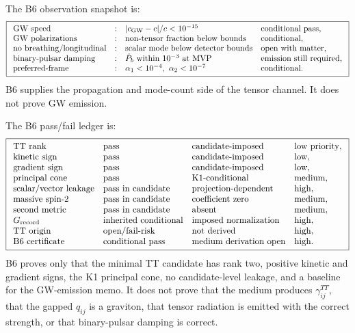 \documentclass[11pt]{article}
\begin{document}
The B6 observation snapshot is:
\[
\boxed{
\begin{array}{llll}
\text{GW speed} &:& |c_{\rm GW}-c|/c<10^{-15} & \text{conditional pass},\\
\text{GW polarizations} &:& \text{non-tensor fraction below bounds} & \text{conditional},\\
\text{no breathing/longitudinal} &:& \text{scalar mode below detector bounds} & \text{open with matter},\\
\text{binary-pulsar damping} &:& \dot P_b\ \text{within }10^{-3}\ \text{at MVP} & \text{emission still required},\\
\text{preferred-frame} &:& \alpha_1<10^{-4},\ \alpha_2<10^{-7} & \text{conditional}.
\end{array}}
\]
B6 supplies the propagation and mode-count side of the tensor channel.  It
does not prove GW emission.

The B6 pass/fail ledger is:
\[
\boxed{
\begin{array}{llll}
\text{TT rank} & \text{pass} & \text{candidate-imposed} & \text{low priority},\\
\text{kinetic sign} & \text{pass} & \text{candidate-imposed} & \text{low},\\
\text{gradient sign} & \text{pass} & \text{candidate-imposed} & \text{low},\\
\text{principal cone} & \text{pass} & \text{K1-conditional} & \text{medium},\\
\text{scalar/vector leakage} & \text{pass in candidate} & \text{projection-dependent} & \text{high},\\
\text{massive spin-2} & \text{pass in candidate} & \text{coefficient zero} & \text{medium},\\
\text{second metric} & \text{pass in candidate} & \text{absent} & \text{medium},\\
G_{\rm record} & \text{inherited conditional} & \text{imposed normalization} & \text{high},\\
\text{TT origin} & \text{open/fail-risk} & \text{not derived} & \text{high},\\
\text{B6 certificate} & \text{conditional pass} & \text{medium derivation open} & \text{high}.
\end{array}}
\]
B6 proves only that the minimal TT candidate has rank two, positive kinetic
and gradient signs, the K1 principal cone, no candidate-level leakage, and a
baseline for the GW-emission memo.  It does not prove that the medium produces
\(\gamma^{TT}_{ij}\), that the gapped \(q_{ij}\) is a graviton, that tensor
radiation is emitted with the correct strength, or that binary-pulsar damping
is correct.
\end{document}
